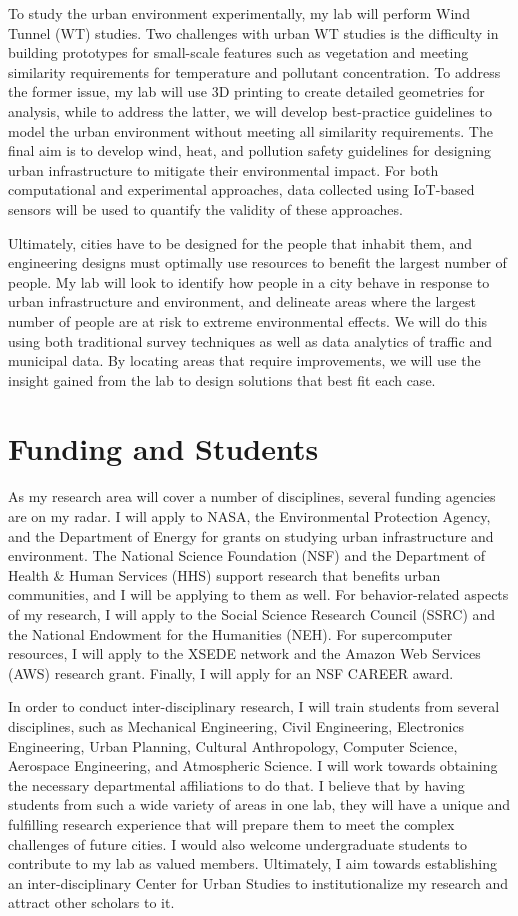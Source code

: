 \documentclass[12pt]{article}
\begin{document}
To study the urban environment experimentally, my lab will perform Wind Tunnel (WT) studies. Two challenges with urban WT studies is the difficulty in building prototypes for small-scale features such as vegetation and meeting similarity requirements for temperature and pollutant concentration. To address the former issue, my lab will use 3D printing to create detailed geometries for analysis, while to address the latter, we will develop best-practice guidelines to model the urban environment without meeting all similarity requirements. The final aim is to develop wind, heat, and pollution safety guidelines for designing urban infrastructure to mitigate their environmental impact. For both computational and experimental approaches, data collected using IoT-based sensors will be used to quantify the validity of these approaches.

Ultimately, cities have to be designed for the people that inhabit them, and engineering designs must optimally use resources to benefit the largest number of people. My lab will look to identify how people in a city behave in response to urban infrastructure and environment, and delineate areas where the largest number of people are at risk to extreme environmental effects. We will do this using both traditional survey techniques as well as data analytics of traffic and municipal data. By locating areas that require improvements, we will use the insight gained from the lab to design solutions that best fit each case. 

\section*{Funding and Students}
As my research area will cover a number of disciplines, several funding agencies are on my radar. I will apply to NASA, the Environmental Protection Agency, and the Department of Energy for grants on studying urban infrastructure and environment. The National Science Foundation (NSF) and the Department of Health \& Human Services (HHS) support research that benefits urban communities, and I will be applying to them as well. For behavior-related aspects of my research, I will apply to the Social Science Research Council (SSRC) and the National Endowment for the Humanities (NEH). For supercomputer resources, I will apply to the XSEDE network and the Amazon Web Services (AWS) research grant. Finally, I will apply for an NSF CAREER award.

In order to conduct inter-disciplinary research, I will train students from several disciplines, such as Mechanical Engineering, Civil Engineering, Electronics Engineering, Urban Planning, Cultural Anthropology, Computer Science, Aerospace Engineering, and Atmospheric Science. I will work towards obtaining the necessary departmental affiliations to do that. I believe that by having students from such a wide variety of areas in one lab, they will have a unique and fulfilling research experience that will prepare them to meet the complex challenges of future cities. I would also welcome undergraduate students to contribute to my lab as valued members. Ultimately, I aim towards establishing an inter-disciplinary Center for Urban Studies to institutionalize my research and attract other scholars to it.

 

\end{document}
